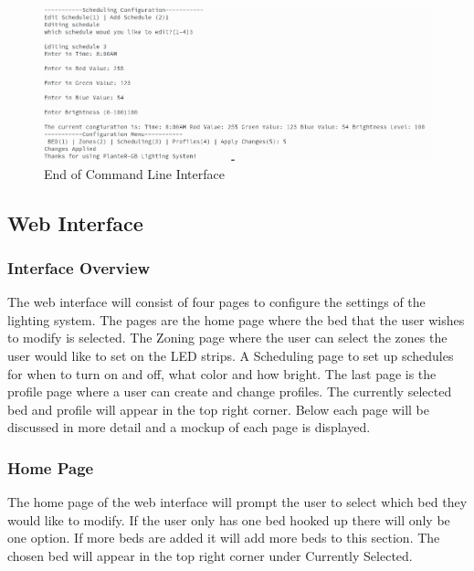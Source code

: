 \documentclass[onecolumn, draftclsnofoot,10pt, compsoc]{IEEEtran}
\begin{document}
\begin{center}
			            \begin{figure}[H]
			                \includegraphics[width=\linewidth]{comand_line_interface/Selection_005.png}
			                \caption{End of Command Line Interface}
			                \label{fig:End of Command Line Interface}
			            \end{figure}
			        \end{center}

			        \subsection{Web Interface}
			            \subsubsection{Interface Overview}
			            The web interface will consist of four pages to configure the settings of
			            the lighting system. The pages are the home page where the bed that the user
			            wishes to modify is selected. The Zoning page where the user can select
			            the zones the user would like to set on the LED strips. A Scheduling page
			            to set up schedules for when to turn on and off, what color and how bright.
			            The last page is the profile page where a user can create and change profiles.
			            The currently selected bed and profile will appear in the top right corner.
			            Below each page will be discussed in more detail and a mockup of each page
			            is displayed.
			            \subsubsection{Home Page}
			            The home page of the web interface will prompt the user to select which
			            bed they would like to modify. If the user only has one bed hooked up there
			            will only be one option. If more beds are added it will add more beds to this
			            section. The chosen bed will appear in the top right corner under Currently
			            Selected.
\end{document}
